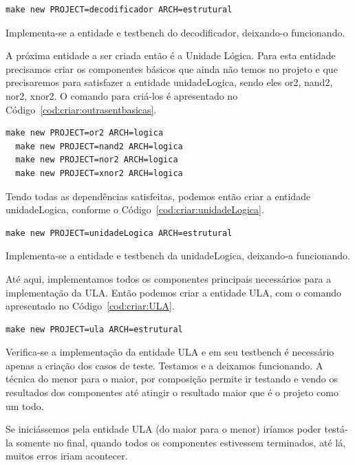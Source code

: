\documentclass[a4paper,10pt]{report}
\begin{document}
\lstset{numbers=left, numberstyle=\tiny, stepnumber=1, numbersep=3pt}
\begin{lstlisting}[label=cod:criar:decodificador,caption=Comando para a criar a entidade Decodificador.]
  make new PROJECT=decodificador ARCH=estrutural
\end{lstlisting}

Implementa-se a entidade e testbench do decodificador, deixando-o funcionando.

A próxima entidade a ser criada então é a Unidade Lógica. Para esta entidade precisamos criar os componentes básicos que ainda não temos no projeto e que precisaremos para satisfazer a entidade unidadeLogica, sendo eles or2, nand2, nor2, xnor2. O comando para criá-los é apresentado no Código~\ref{cod:criar:outrasentbasicas}.

\lstset{numbers=left, numberstyle=\tiny, stepnumber=1, numbersep=3pt}
\begin{lstlisting}[label=cod:criar:outrasentbasicas,caption=Comando para a criar entidades básicas para a Unidade Lógica.]
  make new PROJECT=or2 ARCH=logica
  make new PROJECT=nand2 ARCH=logica
  make new PROJECT=nor2 ARCH=logica
  make new PROJECT=xnor2 ARCH=logica
\end{lstlisting}

Tendo todas as dependências satisfeitas, podemos então criar a entidade unidadeLogica, conforme o Código~\ref{cod:criar:unidadeLogica}.

\lstset{numbers=left, numberstyle=\tiny, stepnumber=1, numbersep=3pt}
\begin{lstlisting}[label=cod:criar:unidadeLogica,caption=Comando para a criar a entidade unidadeLogica.]
  make new PROJECT=unidadeLogica ARCH=estrutural
\end{lstlisting}

Implementa-se a entidade e testbench da unidadeLogica, deixando-a funcionando.

Até aqui, implementamos todos os componentes principais necessários para a implementação da ULA. Então podemos criar a entidade ULA, com o comando apresentado no Código~\ref{cod:criar:ULA}.

\lstset{numbers=left, numberstyle=\tiny, stepnumber=1, numbersep=3pt}
\begin{lstlisting}[label=cod:criar:ULA,caption=Comando para a criar a entidade ULA.]
  make new PROJECT=ula ARCH=estrutural
\end{lstlisting}

Verifica-se a implementação da entidade ULA e em seu testbench é necessário apenas a criação dos casos de teste. Testamos e a deixamos funcionando.
A técnica do menor para o maior, por composição permite ir testando e vendo os resultados dos componentes até atingir o resultado maior que é o projeto como um todo.

Se iniciássemos pela entidade ULA (do maior para o menor) iríamos poder testá-la somente no final, quando todos os componentes estivessem terminados, até lá, muitos erros iriam acontecer.
\end{document}
